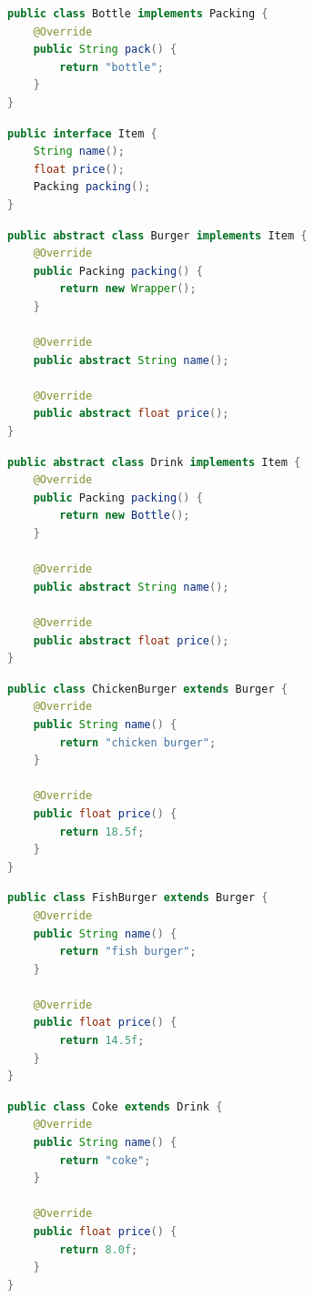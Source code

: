 \begin{lstlisting}[language=Java, title=Bottle.java]
public class Bottle implements Packing {
    @Override
    public String pack() {
        return "bottle";
    }
}
\end{lstlisting}

\begin{lstlisting}[language=Java, title=Item.java]
public interface Item {
    String name();
    float price();
    Packing packing();
}
\end{lstlisting}

\begin{lstlisting}[language=Java, title=Burger.java]
public abstract class Burger implements Item {
    @Override
    public Packing packing() {
        return new Wrapper();
    }

    @Override
    public abstract String name();

    @Override
    public abstract float price();
}
\end{lstlisting}

\begin{lstlisting}[language=Java, title=Drink.java]
public abstract class Drink implements Item {
    @Override
    public Packing packing() {
        return new Bottle();
    }

    @Override
    public abstract String name();

    @Override
    public abstract float price();
}
\end{lstlisting}

\begin{lstlisting}[language=Java, title=ChickenBurger.java]
public class ChickenBurger extends Burger {
    @Override
    public String name() {
        return "chicken burger";
    }

    @Override
    public float price() {
        return 18.5f;
    }
}
\end{lstlisting}

\begin{lstlisting}[language=Java, title=FishBurger.java]
public class FishBurger extends Burger {
    @Override
    public String name() {
        return "fish burger";
    }

    @Override
    public float price() {
        return 14.5f;
    }
}
\end{lstlisting}

\begin{lstlisting}[language=Java, title=Coke.java]
public class Coke extends Drink {
    @Override
    public String name() {
        return "coke";
    }

    @Override
    public float price() {
        return 8.0f;
    }
}
\end{lstlisting}

